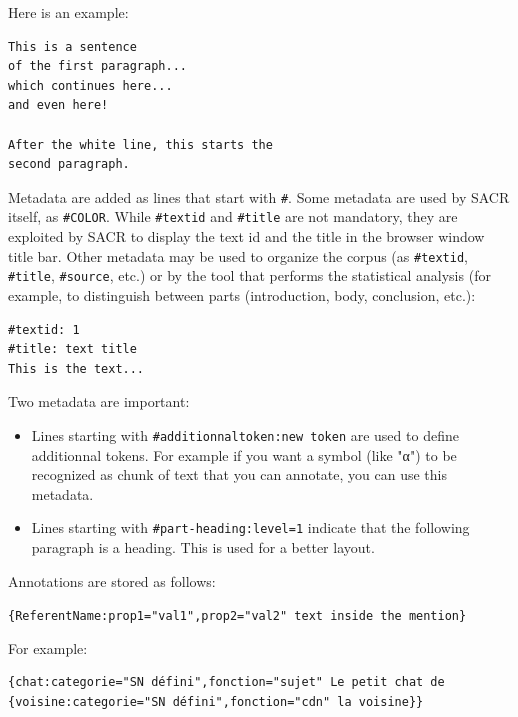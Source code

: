 \documentclass[12pt]{article}
\begin{document}
Here is an example:

\begin{minipage}{\linewidth}
\begin{mdframed}
\begin{verbatim}
This is a sentence
of the first paragraph...
which continues here...
and even here!

After the white line, this starts the
second paragraph.
\end{verbatim}
\end{mdframed}
\end{minipage}

Metadata are added as lines that start with \verb|#|.  Some metadata are used
by SACR itself, as \verb|#COLOR|.  While \verb|#textid| and \verb|#title| are
not mandatory, they are exploited by SACR to display the text id and the
title in the browser window title bar.  Other metadata may be used to
organize the corpus (as \verb|#textid|, \verb|#title|, \verb|#source|, etc.)
or by the tool that performs the statistical analysis (for example, to
distinguish between parts (introduction, body, conclusion, etc.):

\begin{mdframed}
\begin{verbatim}
#textid: 1
#title: text title
This is the text...
\end{verbatim}
\end{mdframed}

Two metadata are important:
\begin{itemize}
   \item Lines starting with \verb+#additionnaltoken:new token+ are used to
   define additionnal tokens.  For example if you want a symbol (like "α") to
   be recognized as chunk of text that you can annotate, you can use this
   metadata.
   \item Lines starting with \verb+#part-heading:level=1+ indicate that the
   following paragraph is a heading.  This is used for a better layout.
\end{itemize}

Annotations are stored as follows:

\verb+{ReferentName:prop1="val1",prop2="val2" text inside the mention}+

For example:

\begin{mdframed}
\begin{verbatim}
{chat:categorie="SN défini",fonction="sujet" Le petit chat de
{voisine:categorie="SN défini",fonction="cdn" la voisine}}
\end{verbatim}
\end{mdframed}
\end{document}
